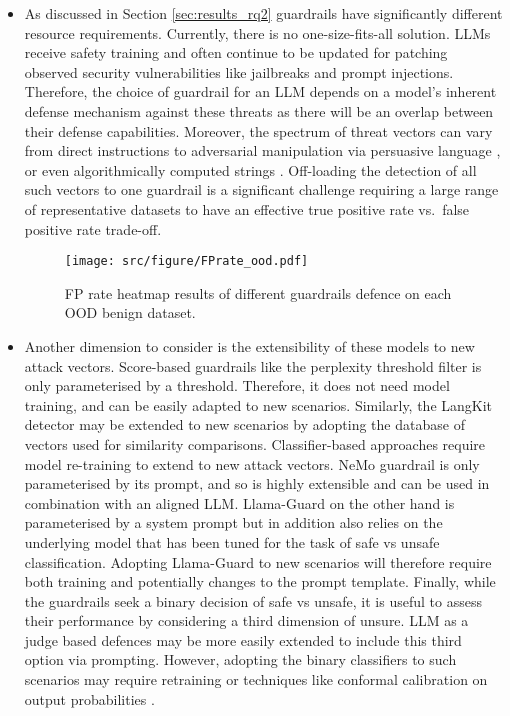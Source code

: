 \begin{itemize}[leftmargin=*,noitemsep]
\item As discussed in Section \ref{sec:results_rq2} guardrails have significantly different resource requirements. Currently, there is no one-size-fits-all solution. 
LLMs receive safety training and often continue to be updated for patching observed security vulnerabilities like jailbreaks and prompt injections.
Therefore, the choice of guardrail for an LLM depends on a model's inherent defense mechanism against these threats as there will be an overlap between their defense capabilities.
Moreover, the spectrum of threat vectors can vary from direct instructions to adversarial manipulation via persuasive language \cite{zeng2024johnny}, or even algorithmically computed strings \cite{zou2023universal}.
Off-loading the detection of all such vectors to one guardrail is a significant challenge requiring a large range of representative datasets to have an effective true positive rate vs.\ false positive rate trade-off.
\begin{figure}
    \centering
    \centerline{\texttt{[image: src/figure/FPrate\_ood.pdf]}}
    \caption{FP rate heatmap results of different guardrails defence on each OOD benign dataset.}
    \label{fig:FPrate_ood}
\end{figure}

\item Another dimension to consider is the extensibility of these models to new attack vectors.
Score-based guardrails like the perplexity threshold filter is only parameterised by a threshold. Therefore, it does not need model training, and can be easily adapted to new scenarios.
Similarly, the LangKit detector may be extended to new scenarios by adopting the database of vectors used for similarity comparisons.
Classifier-based approaches require model re-training to extend to new attack vectors.
NeMo guardrail is only parameterised by its prompt, and so is highly extensible and can be used in combination with an aligned LLM.
Llama-Guard on the other hand is parameterised by a system prompt but in addition also relies on the underlying model that has been tuned for the task of safe vs unsafe classification.
Adopting Llama-Guard to new scenarios will therefore require both training and potentially changes to the prompt template.
Finally, while the guardrails seek a binary decision of safe vs unsafe, it is useful to assess their performance by considering a third dimension of unsure. LLM as a judge based defences may be more easily extended to include this third option via prompting. However, adopting the binary classifiers to such scenarios may require retraining or techniques like conformal calibration on output probabilities \cite{angelopoulos2021gentle}. 
\end{itemize}


